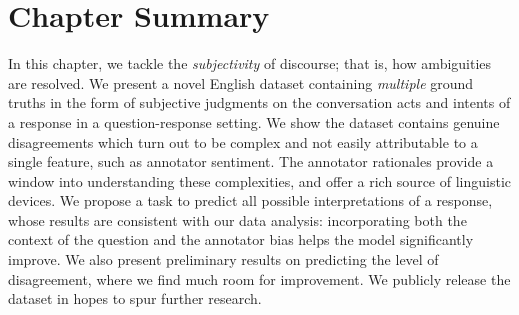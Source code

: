 \section{Chapter Summary}

In this chapter, we tackle the \emph{subjectivity} of discourse; that is, how ambiguities are resolved. We present a novel English dataset containing \emph{multiple} ground truths in the form of subjective judgments on the conversation acts and intents of a response in a question-response setting. We show the dataset contains genuine disagreements which turn out to be complex and not easily attributable to a single feature, such as annotator sentiment. The annotator rationales provide a window into understanding these complexities, and offer a rich source of linguistic devices. We propose a task to predict all possible interpretations of a response, whose results are consistent with our data analysis: incorporating both the context of the question and the annotator bias helps the model significantly improve. We also present preliminary results on predicting the level of disagreement, where we find much room for improvement. We publicly release the dataset in hopes to spur further research.

